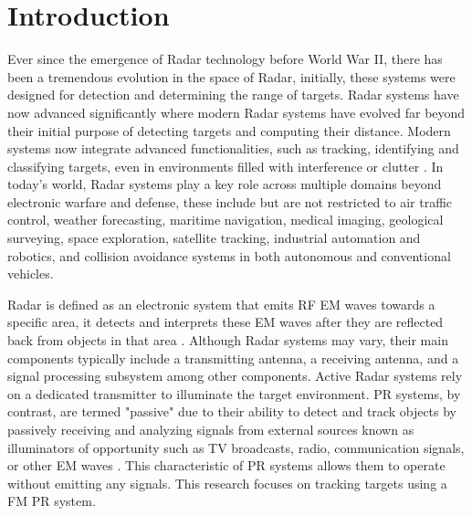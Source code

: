 \newpage
{}
\chapter{Introduction}
Ever since the emergence of \ac{Radar} technology before World War II, there has been a tremendous evolution in the space of \ac{Radar}, initially, these systems were designed for detection and determining the range of targets. \ac{Radar} systems have now advanced significantly where modern \ac{Radar} systems have evolved far beyond their initial purpose of detecting targets and computing their distance. Modern systems now integrate advanced functionalities, such as tracking, identifying and classifying targets, even in environments filled with interference or clutter \cite{Richards2010}. In today's world, \ac{Radar} systems play a key role across multiple domains beyond electronic warfare and defense, these include but are not restricted to air traffic control, weather forecasting, maritime navigation, medical imaging, geological surveying, space exploration, satellite tracking, industrial automation and robotics, and collision avoidance systems in both autonomous and conventional vehicles.

\ac{Radar} is defined as an electronic system that emits \ac{RF} \ac{EM} waves towards a specific area, it detects and interprets these \ac{EM} waves after they are reflected back from objects in that area \cite{Richards2010}. Although \ac{Radar} systems may vary, their main components typically include a transmitting antenna, a receiving antenna, and a signal processing subsystem among other components. Active \ac{Radar} systems rely on a dedicated transmitter to illuminate the target environment. \ac{PR} systems, by contrast, are termed  "passive" due to their ability to detect and track objects by passively receiving and analyzing signals from external sources known as illuminators of opportunity such as TV broadcasts, radio, communication signals, or other \ac{EM} waves \cite{De2015}. This characteristic of \ac{PR} systems allows them to operate without emitting any signals. This research focuses on tracking targets using a \ac{FM} \ac{PR} system.


